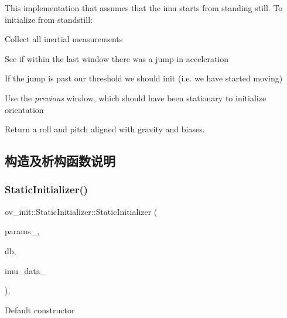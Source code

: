 This implementation that assumes that the imu starts from standing still. To initialize from standstill\+:
\begin{DoxyEnumerate}
\item Collect all inertial measurements
\item See if within the last window there was a jump in acceleration
\item If the jump is past our threshold we should init (i.\+e. we have started moving)
\item Use the {\itshape previous} window, which should have been stationary to initialize orientation
\item Return a roll and pitch aligned with gravity and biases. 
\end{DoxyEnumerate}

\subsection{构造及析构函数说明}
\mbox{\label{classov__init_1_1StaticInitializer_a7c0e4dfac3e8d54a2303fe2cc3137026}} 
\subsubsection{\texorpdfstring{Static\+Initializer()}{StaticInitializer()}}
{\footnotesize\ttfamily ov\+\_\+init\+::\+Static\+Initializer\+::\+Static\+Initializer (\begin{DoxyParamCaption}\item[{\hyperlink{structov__init_1_1InertialInitializerOptions}{Inertial\+Initializer\+Options} \&}]{params\+\_\+,  }\item[{std\+::shared\+\_\+ptr$<$ \hyperlink{classov__core_1_1FeatureDatabase}{ov\+\_\+core\+::\+Feature\+Database} $>$}]{db,  }\item[{std\+::shared\+\_\+ptr$<$ std\+::vector$<$ \hyperlink{structov__core_1_1ImuData}{ov\+\_\+core\+::\+Imu\+Data} $>$$>$}]{imu\+\_\+data\+\_\+ }\end{DoxyParamCaption})\hspace{0.3cm}{\ttfamily [inline]}, {\ttfamily [explicit]}}



Default constructor 


